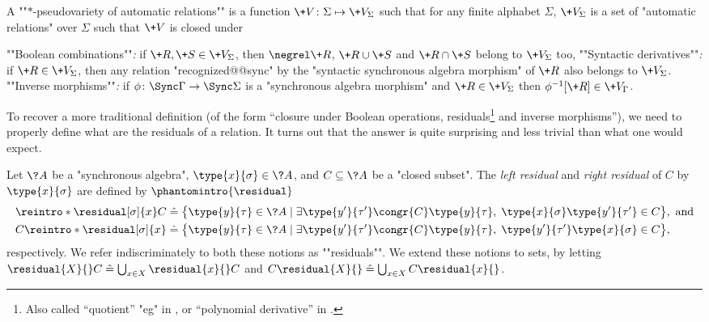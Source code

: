 A \AP""$\ast$-pseudovariety of automatic relations"" is a function $\+V \colon \Sigma \mapsto \+V_\Sigma$
such that for any finite alphabet $\Sigma$, $\+V_\Sigma$ is a set of "automatic relations" over 
$\Sigma$ such that $\+V$ is closed under
\begin{itemize}
	\itemAP ""Boolean combinations""\emph{:} if $\+R, \+S \in \+V_{\Sigma}$, then
		$\negrel\+R$, $\+R \cup \+S$ and $\+R \cap \+S$ belong to $\+V_{\Sigma}$ too,
	\itemAP ""Syntactic derivatives""\emph{:} if $\+R \in \+V_{\Sigma}$, then any relation
	"recognized@@sync" by the "syntactic synchronous algebra morphism" of $\+R$ also belongs
	to $\+V_{\Sigma}$.
	\itemAP ""Inverse morphisms""\emph{:} if $\phi\colon \Sync\Gamma \to \Sync\Sigma$ is
		a "synchronous algebra morphism" and $\+R \in \+V_{\Sigma}$ then
		$\phi^{-1}[\+R] \in \+V_{\Gamma}$. 
\end{itemize}

To recover a more traditional definition (of the form ``closure under Boolean operations, residuals\footnote{Also called ``quotient'' "eg" in \cite[\S III.1.3, p.~39]{Pin2022MathematicalFoundations}, or ``polynomial derivative'' in \cite[\S 4, p.~19]{Bojanczyk2015Recognisable}.} and inverse morphisms''), we need to properly define what are the residuals of a relation. It 
turns out that the answer is quite surprising and less trivial than what one would expect.

\begin{definition}[Residuals]
	\AP\label{def:residuals}
	Let $\?A$ be a "synchronous algebra", $\type{x}{\sigma} \in \?A$,
	and $C \subseteq \?A$ be a "closed subset".
	The \emph{left residual} and \emph{right residual} of $C$ by $\type{x}{\sigma}$ are defined by
	$\phantomintro{\residual}$
	\begin{align*}
		\reintro*\residual[\sigma]{x} C & \defeq
		\bigl\{
			\type{y}{\tau} \in \?A \mid
				\exists \type{y'}{\tau'} \congr{C} \type{y}{\tau},\;
				\type{x}{\sigma} \type{y'}{\tau'} \in C
		\bigr\}, \text{ and} \\
		C\reintro*\residual[\sigma]{x} & \defeq
		\bigl\{
			\type{y}{\tau} \in \?A \mid
				\exists \type{y'}{\tau'} \congr{C} \type{y}{\tau},\;
				\type{y'}{\tau'}\type{x}{\sigma} \in C
		\bigr\},
	\end{align*}
	respectively. We refer indiscriminately to both these notions as \AP""residuals"".
	We extend these notions to sets, by letting
	$\residual{X}{}C \defeq \bigcup_{x\in X}\residual{x}{}C$
	and $C\residual{X}{} \defeq \bigcup_{x\in X} C\residual{x}{}$.
\end{definition}

